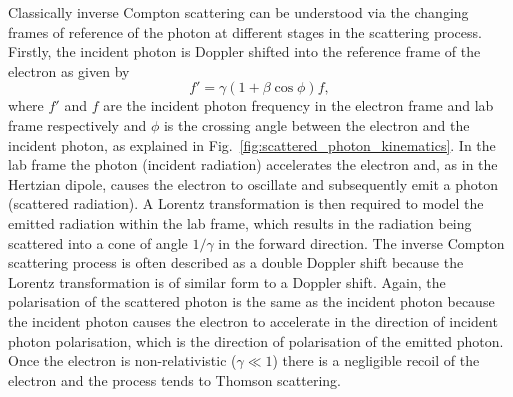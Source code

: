 \documentclass[../main.tex]{subfiles}
\begin{document}
Classically inverse Compton scattering can be understood via the changing frames of reference of the photon at different stages in the scattering process. Firstly, the incident photon is Doppler shifted into the reference frame of the electron as given by
\begin{equation}
f'=\gamma\left(1+\beta\cos\phi\right)f,    
\end{equation}
where $f'$ and $f$ are the incident photon frequency in the electron frame and lab frame respectively and $\phi$ is the crossing angle between the electron and the incident photon, as explained in Fig.~\ref{fig:scattered_photon_kinematics}. In the lab frame the photon (incident radiation) accelerates the electron and, as in the Hertzian dipole, causes the electron to oscillate and subsequently emit a photon (scattered radiation). A Lorentz transformation is then required to model the emitted radiation within the lab frame, which results in the radiation being scattered into a cone of angle $1/\gamma$ in the forward direction. The inverse Compton scattering process is often described as a double Doppler shift because the Lorentz transformation is of similar form to a Doppler shift. Again, the polarisation of the scattered photon is the same as the incident photon because the incident photon causes the electron to accelerate in the direction of incident photon polarisation, which is the direction of polarisation of the emitted photon. Once the electron is non-relativistic ($\gamma \ll 1$) there is a negligible recoil of the electron and the process tends to Thomson scattering.
\end{document}
